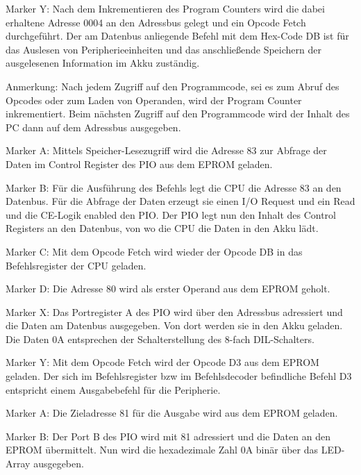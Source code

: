 Marker Y: Nach dem Inkrementieren des Program Counters wird die dabei erhaltene Adresse 0004 an den Adressbus gelegt und ein Opcode Fetch durchgeführt. Der am Datenbus anliegende Befehl mit dem Hex-Code DB ist für das Auslesen von Peripherieeinheiten und das anschließende Speichern der ausgelesenen Information im Akku zuständig.

\begin{warning}
    Anmerkung: Nach jedem Zugriff auf den Programmcode, sei es zum Abruf des Opcodes oder zum Laden von Operanden, wird der Program Counter inkrementiert. Beim nächsten Zugriff auf den Programmcode wird der Inhalt des PC dann auf dem Adressbus ausgegeben.
\end{warning}

Marker A: Mittels Speicher-Lesezugriff wird die Adresse 83 zur Abfrage der Daten im Control Register des PIO aus dem EPROM geladen.

Marker B: Für die Ausführung des Befehls legt die CPU die Adresse 83 an den Datenbus. Für die Abfrage der Daten erzeugt sie einen I/O Request und ein Read und die CE-Logik enabled den PIO. Der PIO legt nun den Inhalt des Control Registers an den Datenbus, von wo die CPU die Daten in den Akku lädt.

Marker C: Mit dem Opcode Fetch wird wieder der Opcode DB in das Befehlsregister der CPU geladen.

Marker D: Die Adresse 80 wird als erster Operand aus dem EPROM geholt.

Marker X: Das Portregister A des PIO wird über den Adressbus adressiert und die Daten am Datenbus ausgegeben. Von dort werden sie in den Akku geladen. Die Daten 0A entsprechen der Schalterstellung des 8-fach DIL-Schalters.

Marker Y: Mit dem Opcode Fetch wird der Opcode D3 aus dem EPROM geladen. Der sich im Befehlsregister bzw im Befehlsdecoder befindliche Befehl D3 entspricht einem Ausgabebefehl für die Peripherie.

Marker A: Die Zieladresse 81 für die Ausgabe wird aus dem EPROM geladen.

Marker B: Der Port B des PIO wird mit 81 adressiert und die Daten an den EPROM übermittelt. Nun wird die hexadezimale Zahl 0A binär über das LED-Array ausgegeben.

